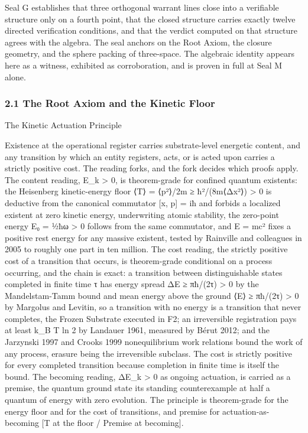 \documentclass[10pt,twocolumn]{article}
\begin{document}
Seal G establishes that three orthogonal warrant lines close into a
verifiable structure only on a fourth point, that the closed structure
carries exactly twelve directed verification conditions, and that the
verdict computed on that structure agrees with the algebra. The seal
anchors on the Root Axiom, the closure geometry, and the sphere packing
of three-space. The algebraic identity appears here as a witness,
exhibited as corroboration, and is proven in full at Seal M alone.

\hypertarget{the-root-axiom-and-the-kinetic-floor}{%
\subsubsection{2.1 The Root Axiom and the Kinetic
Floor}\label{the-root-axiom-and-the-kinetic-floor}}

\begin{jbox}{The Kinetic Actuation Principle}

Existence at the operational register carries substrate-level energetic
content, and any transition by which an entity registers, acts, or is
acted upon carries a strictly positive cost. The reading forks, and the
fork decides which proofs apply. The content reading, E\_k
\textgreater{} 0, is theorem-grade for confined quantum existents: the
Heisenberg kinetic-energy floor ⟨T⟩ = ⟨p²⟩/2m ≥ ħ²/(8m⟨Δx²⟩)
\textgreater{} 0 is deductive from the canonical commutator {[}x, p{]} =
iħ and forbids a localized existent at zero kinetic energy, underwriting
atomic stability, the zero-point energy E₀ = ½ħω \textgreater{} 0
follows from the same commutator, and E = mc² fixes a positive rest
energy for any massive existent, tested by Rainville and colleagues in
2005 to roughly one part in ten million. The cost reading, the strictly
positive cost of a transition that occurs, is theorem-grade conditional
on a process occurring, and the chain is exact: a transition between
distinguishable states completed in finite time τ has energy spread ΔE ≥
πħ/(2τ) \textgreater{} 0 by the Mandelstam-Tamm bound and mean energy
above the ground ⟨E⟩ ≥ πħ/(2τ) \textgreater{} 0 by Margolus and Levitin,
so a transition with no energy is a transition that never completes, the
Frozen Substrate executed in F2; an irreversible registration pays at
least k\_B T ln 2 by Landauer 1961, measured by Bérut 2012; and the
Jarzynski 1997 and Crooks 1999 nonequilibrium work relations bound the
work of any process, erasure being the irreversible subclass. The cost
is strictly positive for every completed transition because completion
in finite time is itself the bound. The becoming reading, ΔE\_k
\textgreater{} 0 as ongoing actuation, is carried as a premise, the
quantum ground state its standing counterexample at half a quantum of
energy with zero evolution. The principle is theorem-grade for the
energy floor and for the cost of transitions, and premise for
actuation-as-becoming {[}T at the floor / Premise at becoming{]}.

\end{jbox}
\end{document}
